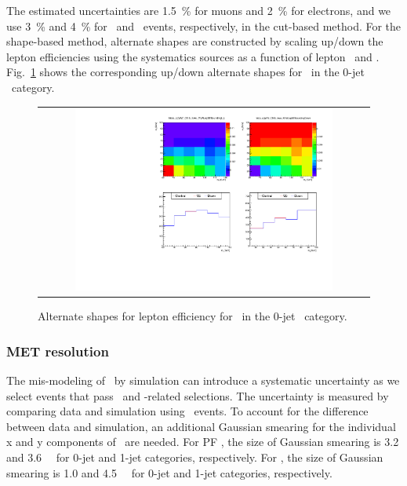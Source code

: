 The estimated uncertainties are 1.5~\% for muons and 2~\% for electrons, 
and we use 3~\% and 4~\% for \mumu\ and \ee\ events, respectively, 
in the cut-based method. 
For the shape-based method, alternate shapes are constructed by
scaling up/down the lepton efficiencies using the systematics sources
as a function of lepton \pt\ and \Eta.
Fig.~\ref{fig:alter_lepeff} shows the corresponding up/down alternate shapes
for \qqww\ in the 0-jet \DF\ category. 

%
\begin{figure}[htp]
\centering
\begin{tabular}{c}
\includegraphics[width=0.8\textwidth]{figures/histo_qqWW_CMS_hww_MVALepEffBounding_0j_zoom.pdf}
\end{tabular}
\caption{Alternate shapes for lepton efficiency for \qqww\ in the 0-jet \DF\ category. }
\label{fig:alter_lepeff}
\end{figure}


\subsubsection{MET resolution} 

The mis-modeling of \met\ by simulation can introduce a systematic uncertainty 
as we select events that pass \met\ and \met-related selections. 
The uncertainty is measured 
by comparing data and simulation using \dyll\ events. To account for the 
difference between data and simulation, an additional Gaussian smearing for 
the individual x and y components of \met\ are needed. 
For PF \met, the size of Gaussian smearing is 3.2 and 3.6~\GeV\ %
for 0-jet and 1-jet categories, respectively.  
For \trkmet, the size of Gaussian smearing is 1.0 and 4.5~\GeV\ %
for 0-jet and 1-jet categories, respectively.  

